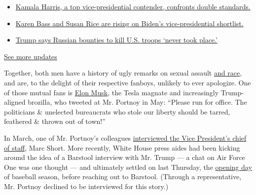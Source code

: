 \begin{itemize}
\tightlist
\item
  \href{https://www.nytimes3xbfgragh.onion/2020/07/31/us/elections/biden-vs-trump.html?action=click\&pgtype=Article\&state=default\&region=MAIN_CONTENT_1\&context=storylines_live_updates\#link-29fdff45}{Kamala
  Harris, a top vice-presidential contender, confronts double
  standards.}
\item
  \href{https://www.nytimes3xbfgragh.onion/2020/07/31/us/elections/biden-vs-trump.html?action=click\&pgtype=Article\&state=default\&region=MAIN_CONTENT_1\&context=storylines_live_updates\#link-13ec3d9c}{Karen
  Bass and Susan Rice are rising on Biden's vice-presidential
  shortlist.}
\item
  \href{https://www.nytimes3xbfgragh.onion/2020/07/31/us/elections/biden-vs-trump.html?action=click\&pgtype=Article\&state=default\&region=MAIN_CONTENT_1\&context=storylines_live_updates\#link-49e9a016}{Trump
  says Russian bounties to kill U.S. troops `never took place.'}
\end{itemize}

\href{https://www.nytimes3xbfgragh.onion/2020/07/31/us/elections/biden-vs-trump.html?action=click\&pgtype=Article\&state=default\&region=MAIN_CONTENT_1\&context=storylines_live_updates}{See
more updates}

Together, both men have a history of ugly remarks on sexual assault
\href{https://www.nydailynews.com/sports/football/ny-barstool-sports-portnoy-racism-20200706-6qoawvrjbnce5cygbknhlp2wwe-story.html}{and
race}, and are, to the delight of their respective fanboys, unlikely to
ever apologize. One of those mutual fans is
\href{https://www.nytimes3xbfgragh.onion/2020/07/25/style/elon-musk-maureen-dowd.html}{Elon
Musk}, the Tesla magnate and increasingly Trump-aligned brozilla, who
tweeted at Mr. Portnoy in May: ``Please run for office. The politicians
\& unelected bureaucrats who stole our liberty should be tarred,
feathered \& thrown out of town!''

In March, one of Mr. Portnoy's colleagues
\href{https://www.barstoolsports.com/video/2198855/riggs-visits-white-house-grounds-for-coronavirus-interview-with-vp-chief-of-staff-marc-short}{interviewed
the Vice President's chief of staff}, Marc Short. More recently, White
House press aides had been kicking around the idea of a Barstool
interview with Mr. Trump --- a chat on Air Force One was one thought ---
and ultimately settled on last Thursday, the
\href{https://www.nytimes3xbfgragh.onion/2020/07/29/sports/baseball/mlb-season-coronavirus.html}{opening
day} of baseball season, before reaching out to Barstool. (Through a
representative, Mr. Portnoy declined to be interviewed for this story.)

